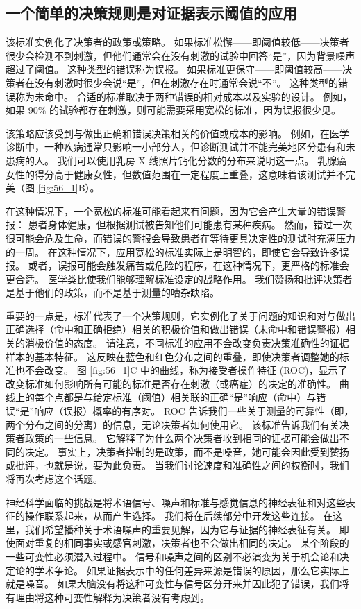 \subsection{一个简单的决策规则是对证据表示阈值的应用}

该标准实例化了决策者的政策或策略。
如果标准松懈——即阈值较低——决策者很少会检测不到刺激，但他们通常会在没有刺激的试验中回答“是”，因为背景噪声超过了阈值。
这种类型的错误称为误报。
如果标准更保守——即阈值较高——决策者在没有刺激时很少会说“是”，但在刺激存在时通常会说“不”。
这种类型的错误称为未命中。
合适的标准取决于两种错误的相对成本以及实验的设计。
例如，如果 90\% 的试验都存在刺激，则可能需要采用宽松的标准，因为误报很少见。


该策略应该受到与做出正确和错误决策相关的价值或成本的影响。
例如，在医学诊断中，一种疾病通常只影响一小部分人，但诊断测试并不能完美地区分患有和未患病的人。
我们可以使用乳房 X 线照片钙化分数的分布来说明这一点。
乳腺癌女性的得分高于健康女性，但数值范围在一定程度上重叠，这意味着该测试并不完美（图 \ref{fig:56_1}B）。


在这种情况下，一个宽松的标准可能看起来有问题，因为它会产生大量的错误警报：
患者身体健康，但根据测试被告知他们可能患有某种疾病。
然而，错过一次很可能会危及生命，而错误的警报会导致患者在等待更具决定性的测试时充满压力的一周。
在这种情况下，应用宽松的标准实际上是明智的，即使它会导致许多误报。
或者，误报可能会触发痛苦或危险的程序，在这种情况下，更严格的标准会更合适。
医学类比使我们能够理解标准设定的战略作用。
我们赞扬和批评决策者是基于他们的政策，而不是基于测量的嘈杂缺陷。


重要的一点是，标准代表了一个决策规则，它实例化了关于问题的知识和对与做出正确选择（命中和正确拒绝）相关的积极价值和做出错误（未命中和错误警报）相关的消极价值的态度。
请注意，不同标准的应用不会改变负责决策准确性的证据样本的基本特征。
这反映在蓝色和红色分布之间的重叠，即使决策者调整她的标准也不会改变。
图 \ref{fig:56_1}C 中的曲线，称为接受者操作特征 (ROC)，显示了改变标准如何影响所有可能的标准是否存在刺激（或癌症）的决定的准确性。
曲线上的每个点都是与给定标准（阈值）相关联的正确“是”响应（命中）与错误“是”响应（误报）概率的有序对。
ROC 告诉我们一些关于测量的可靠性（即，两个分布之间的分离）的信息，无论决策者如何使用它。
该标准告诉我们有关决策者政策的一些信息。
它解释了为什么两个决策者收到相同的证据可能会做出不同的决定。
事实上，决策者控制的是政策，而不是噪音，她可能会因此受到赞扬或批评，也就是说，要为此负责。
当我们讨论速度和准确性之间的权衡时，我们将再次考虑这个话题。


神经科学面临的挑战是将术语信号、噪声和标准与感觉信息的神经表征和对这些表征的操作联系起来，从而产生选择。
我们将在后续部分中开发这些连接。
在这里，我们希望播种关于术语噪声的重要见解，因为它与证据的神经表征有关。
即使面对重复的相同事实或感官刺激，决策者也不会做出相同的决定。
某个阶段的一些可变性必须潜入过程中。
信号和噪声之间的区别不必演变为关于机会论和决定论的学术争论。
如果证据表示中的任何差异来源是错误的原因，那么它实际上就是噪音。
如果大脑没有将这种可变性与信号区分开来并因此犯了错误，我们将有理由将这种可变性解释为决策者没有考虑到。


